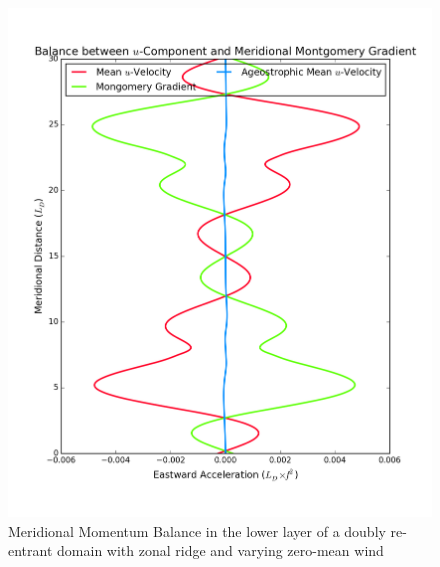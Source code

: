 \documentclass[12pt,a4paper]{report}
\begin{document}
  
  \begin{figure}
  	\centering
  	\begin{minipage}[b]{0.45\linewidth}
  		\centering
  		\includegraphics[width=\linewidth ]{vgeo_1}
  		\caption{Meridional Momentum Balance in the lower layer of 
  			a doubly re-entrant domain with 
  			zonal ridge and varying zero-mean wind}
  		\label{fig:vgeolayer1}
  	\end{minipage}
  	\quad
  	\begin{minipage}[b]{0.45\linewidth}
  		\centering

\end{minipage}
\end{figure}
\end{document}
